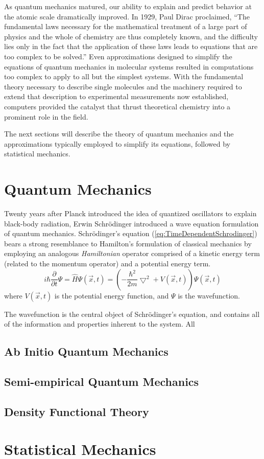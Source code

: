 As quantum mechanics matured, our ability to explain and predict behavior at the
atomic scale dramatically improved. In 1929, Paul Dirac proclaimed, ``The
fundamental laws necessary for the mathematical treatment of a large part of
physics and the whole of chemistry are thus completely known, and the difficulty
lies only in the fact that the application of these laws leads to equations that
are too complex to be solved.'' Even approximations designed to simplify the
equations of quantum mechanics in molecular systems resulted in computations too
complex to apply to all but the simplest systems. With the fundamental theory
necessary to describe single molecules and the machinery required to extend
that description to experimental measurements now established, computers
provided the catalyst that thrust theoretical chemistry into a prominent role in
the field.

The next sections will describe the theory of quantum mechanics and the
approximations typically employed to simplify its equations, followed by
statistical mechanics.

\section{Quantum Mechanics}
Twenty years after Planck introduced the idea of quantized oscillators to
explain black-body radiation, Erwin Schr\"odinger introduced a wave equation
formulation of quantum mechanics. \cite{Schrodinger1926} Schr\"odinger's
equation (\ref{eq:TimeDependentSchrodinger}) bears a strong resemblance
to Hamilton's formulation of classical mechanics by employing an analogous
\textit{Hamiltonian} operator comprised of a kinetic energy term (related to
the momentum operator) and a potential energy term.
\begin{equation}
   i \hbar \frac {\partial} {\partial t} \Psi  =  \hat{H} \Psi(\vec{x}, t)
         =  \left ( - \frac {\hbar^2} {2m} \bigtriangledown^2 + V(\vec{x}, t)
           \right ) \Psi(\vec{x}, t)
   \label{eq:TimeDependentSchrodinger}
\end{equation}
where $V(\vec{x}, t)$ is the potential energy function, and $\Psi$ is the
wavefunction.

The wavefunction is the central object of Schr\"odinger's equation, and contains
all of the information and properties inherent to the system. All

\subsection{Ab Initio Quantum Mechanics}

\subsection{Semi-empirical Quantum Mechanics}

\subsection{Density Functional Theory}

\section{Statistical Mechanics}
